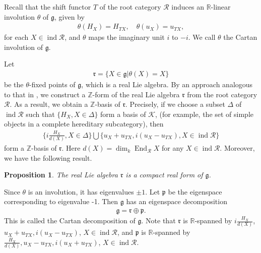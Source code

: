 \documentclass[10pt,a4paper]{amsart}
\newtheorem{proposition}[theorem]{Proposition}
\begin{document}
Recall that the shift functor $T$ of the root category $\mathcal{R}$ induces an $\mathbb{R}$-linear involution $\theta$ of $\mathfrak{g}$, given by 
\begin{align*}
    \theta(H_X)=H_{TX}, \quad \theta(u_X)=u_{TX},
\end{align*}
for each $X\in \operatorname{ind}\mathcal{R}$, and $\theta$ maps the imaginary unit $i$ to $-i$. 
We call $\theta$ the Cartan involution of $\mathfrak{g}$.

Let 
\begin{align*}
    \mathfrak{r}=\{ X\in \mathfrak{g}| \theta(X)=X \}
\end{align*}
be the $\theta$-fixed points of $\mathfrak{g}$, which is a real Lie algebra.
By an approach analogous to that in \cite{1997ROOT}, we construct a $\mathbb{Z}$-form of the real Lie algebra $\mathfrak{r}$ from the root category $\mathcal{R}$.
As a result, we obtain a $\mathbb{Z}$-basis of $\mathfrak{r}$. 
Precisely, if we choose a subset $\Delta$ of $\operatorname{ind}\mathcal{R}$ such that $\{H_X,X\in \Delta\}$ form a basis of $\mathcal{K}$, (for example, the set of simple objects in a complete hereditary subcategory), then 
\begin{align*}
    \{i\frac{H_X}{d(X)},X\in \Delta\}\bigcup \{u_X+u_{TX},i(u_X-u_{TX}),X\in \operatorname{ind}\mathcal{R}\}
\end{align*}
form a $\mathbb{Z}$-basis of $\mathfrak{r}$. 
Here $d(X)=\operatorname{dim}_k\operatorname{End}_{\mathcal{R}}X$ for any $X\in \operatorname{ind}\mathcal{R}$.
Moreover, we have the following result.

\begin{proposition}
    \cite[Proposition 30]{notes2}
    The real Lie algebra $\mathfrak{r}$ is a compact real form of $\mathfrak{g}$.
\end{proposition}

Since $\theta$ is an involution, it has eigenvalues $\pm 1$.
Let $\mathfrak{p}$ be the eigenspace corresponding to eigenvalue -1. 
Then $\mathfrak{g}$ has an eigenspace decomposition
\begin{align*}
    \mathfrak{g}=\mathfrak{r}\oplus \mathfrak{p}.
\end{align*}
This is called the Cartan decomposition of $\mathfrak{g}$.
Note that $\mathfrak{r}$ is $\mathbb{R}$-spanned by $i\frac{H_X}{d(X)}$, $u_X+u_{TX},i(u_X-u_{TX})$, $X\in \operatorname{ind}\mathcal{R}$, and $\mathfrak{p}$ is $\mathbb{R}$-spanned by $\frac{H_X}{d(X)},u_X-u_{TX},i(u_X+u_{TX})$, $X\in \operatorname{ind}\mathcal{R}$.
\end{document}
